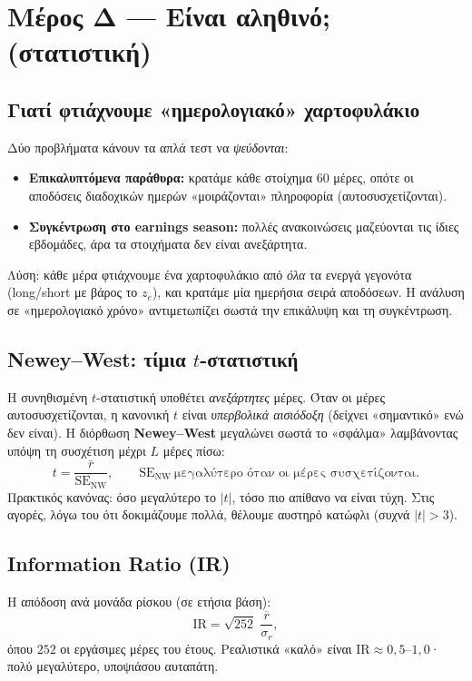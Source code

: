 \documentclass[11pt]{article}
\begin{document}
\section{Μέρος Δ — Είναι αληθινό; (στατιστική)}

\subsection{Γιατί φτιάχνουμε «ημερολογιακό» χαρτοφυλάκιο}
Δύο προβλήματα κάνουν τα απλά τεστ να \emph{ψεύδονται}:
\begin{itemize}[leftmargin=1.6em]
  \item \textbf{Επικαλυπτόμενα παράθυρα:} κρατάμε κάθε στοίχημα 60 μέρες, οπότε οι αποδόσεις
        διαδοχικών ημερών «μοιράζονται» πληροφορία (αυτοσυσχετίζονται).
  \item \textbf{Συγκέντρωση στο earnings season:} πολλές ανακοινώσεις μαζεύονται τις ίδιες
        εβδομάδες, άρα τα στοιχήματα δεν είναι ανεξάρτητα.
\end{itemize}
Λύση: κάθε μέρα φτιάχνουμε ένα χαρτοφυλάκιο από \emph{όλα} τα ενεργά γεγονότα (long/short με
βάρος το $z_e$), και κρατάμε μία ημερήσια σειρά αποδόσεων. Η ανάλυση σε «ημερολογιακό χρόνο»
αντιμετωπίζει σωστά την επικάλυψη και τη συγκέντρωση.

\subsection{Newey--West: τίμια $t$-στατιστική}
Η συνηθισμένη $t$-στατιστική υποθέτει \emph{ανεξάρτητες} μέρες. Όταν οι μέρες
αυτοσυσχετίζονται, η κανονική $t$ είναι \emph{υπερβολικά αισιόδοξη} (δείχνει «σημαντικό» ενώ
δεν είναι). Η διόρθωση \textbf{Newey--West} μεγαλώνει σωστά το «σφάλμα» λαμβάνοντας υπόψη τη
συσχέτιση μέχρι $L$ μέρες πίσω:
\[ t=\frac{\bar{r}}{\mathrm{SE}_{\text{NW}}},\qquad
   \mathrm{SE}_{\text{NW}}\ \text{μεγαλύτερο όταν οι μέρες συσχετίζονται.} \]
Πρακτικός κανόνας: όσο μεγαλύτερο το $|t|$, τόσο πιο απίθανο να είναι τύχη. Στις αγορές, λόγω
του ότι δοκιμάζουμε πολλά, θέλουμε αυστηρό κατώφλι (συχνά $|t|>3$).

\subsection{Information Ratio (IR)}
Η απόδοση ανά μονάδα ρίσκου (σε ετήσια βάση):
\[ \mathrm{IR}=\sqrt{252}\;\frac{\overline{r}}{\sigma_r}, \]
όπου $252$ οι εργάσιμες μέρες του έτους. Ρεαλιστικά «καλό» είναι $\mathrm{IR}\approx0{,}5$--$1{,}0$·
πολύ μεγαλύτερο, υποψιάσου αυταπάτη.
\end{document}

